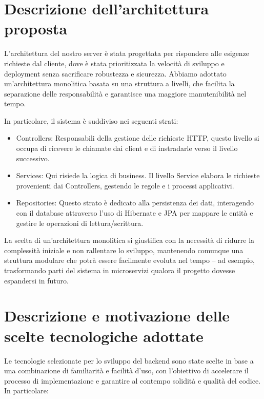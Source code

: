 \section{Descrizione dell'architettura proposta}
L'architettura del nostro server è stata progettata per rispondere alle esigenze richieste dal cliente, dove è stata prioritizzata la velocità di sviluppo e deployment senza sacrificare robustezza e sicurezza. Abbiamo adottato un'architettura monolitica basata su una struttura a livelli, che facilita la separazione delle responsabilità e garantisce una maggiore manutenibilità nel tempo.

In particolare, il sistema è suddiviso nei seguenti strati:

\begin{itemize}
    \item Controllers: Responsabili della gestione delle richieste HTTP, questo livello si occupa di ricevere le chiamate dai client e di instradarle verso il livello successivo.
    \item Services: Qui risiede la logica di business. Il livello Service elabora le richieste provenienti dai Controllers, gestendo le regole e i processi applicativi.
    \item Repositories: Questo strato è dedicato alla persistenza dei dati, interagendo con il database attraverso l’uso di Hibernate e JPA per mappare le entità e gestire le operazioni di lettura/scrittura.

\end{itemize}
La scelta di un'architettura monolitica si giustifica con la necessità di ridurre la complessità iniziale e non rallentare lo sviluppo, mantenendo comunque una struttura modulare che potrà essere facilmente evoluta nel tempo – ad esempio, trasformando parti del sistema in microservizi qualora il progetto dovesse espandersi in futuro.

\newpage
\section{Descrizione e motivazione delle scelte tecnologiche adottate}
Le tecnologie selezionate per lo sviluppo del backend sono state scelte in base a una combinazione di familiarità e facilità d'uso, con l'obiettivo di accelerare il processo di implementazione e garantire al contempo solidità e qualità del codice. In particolare:

